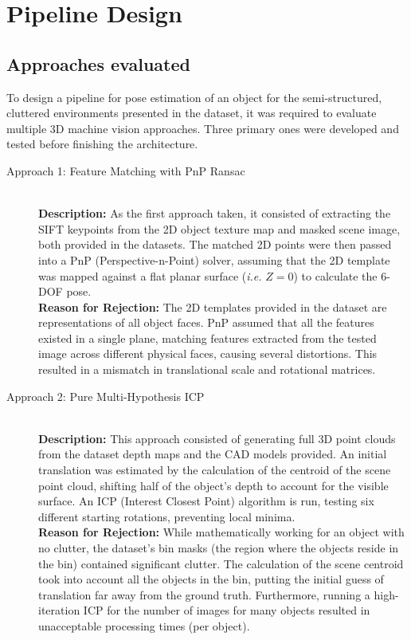 \section{Pipeline Design}
\subsection{Approaches evaluated}

To design a pipeline for pose estimation of an object for the semi-structured, cluttered environments presented in the dataset, it was required to evaluate multiple 3D machine vision approaches. Three primary ones were developed and tested before finishing the architecture.

\begin{description}
    \item[Approach 1: Feature Matching with PnP Ransac]\hfill\\
    \textbf{Description:} As the first approach taken, it consisted of extracting the SIFT keypoints from the 2D object texture map and masked scene image, both provided in the datasets. The matched 2D points were then passed into a PnP (Perspective-n-Point) solver, assuming that the 2D template was mapped against a flat planar surface (\textit{i.e.} $Z=0$) to calculate the 6-DOF pose. \\
    \textbf{Reason for Rejection:} The 2D templates provided in the dataset are representations of all object faces. PnP assumed that all the features existed in a single plane, matching features extracted from the tested image across different physical faces, causing several distortions. This resulted in a mismatch in translational scale and rotational matrices.
    
    \item[Approach 2: Pure Multi-Hypothesis ICP]\hfill\\
    \textbf{Description:} This approach consisted of generating full 3D point clouds from the dataset depth maps and the CAD models provided. An initial translation was estimated by the calculation of the centroid of the scene point cloud, shifting half of the object's depth to account for the visible surface. An ICP (Interest Closest Point) algorithm is run, testing six different starting rotations, preventing local minima.\\
    \textbf{Reason for Rejection:} While mathematically working for an object with no clutter, the dataset's bin masks (the region where the objects reside in the bin) contained significant clutter. The calculation of the scene centroid took into account all the objects in the bin, putting the initial guess of translation far away from the ground truth. Furthermore, running a high-iteration ICP for the number of images for many objects resulted in unacceptable processing times (per object).
    

\end{description}
